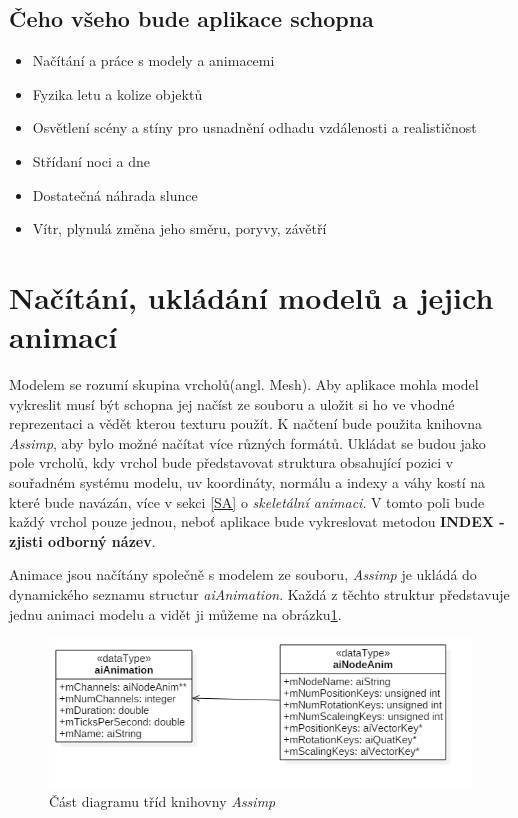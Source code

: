 \subsection{Čeho všeho bude aplikace schopna}
\begin{itemize}
	\item Načítání a práce s modely a animacemi
	\item Fyzika letu a kolize objektů
	\item Osvětlení scény a stíny pro usnadnění odhadu vzdálenosti a realističnost
	\item Střídaní noci a dne
	\item Dostatečná náhrada slunce
	\item Vítr, plynulá změna jeho směru, poryvy, závětří
\end{itemize}
\section{Načítání, ukládání modelů a jejich animací}

Modelem se rozumí skupina vrcholů(angl. Mesh). Aby aplikace mohla model vykreslit musí být schopna jej načíst ze souboru a uložit si ho ve vhodné reprezentaci a vědět kterou texturu použít. K načtení bude použita knihovna \emph{Assimp}\cite{assimp}, aby bylo možné načítat více různých formátů. Ukládat se budou jako pole vrcholů, kdy vrchol bude představovat struktura obsahující pozici v souřadném systému modelu, uv koordináty, normálu a indexy a váhy kostí na které bude navázán, více v sekci \ref{SA} o \emph{skeletální animaci}. V tomto poli bude každý vrchol pouze jednou, neboť aplikace bude vykreslovat metodou \textbf{INDEX - zjisti odborný název}.
    
Animace jsou načítány společně s modelem ze souboru, \emph{Assimp} je ukládá do dynamického seznamu structur \emph{aiAnimation}. Každá z těchto struktur představuje jednu animaci modelu a vidět ji můžeme na obrázku\ref{aiAnimation}. 
\begin{figure}
	\begin{center}
		\includegraphics[scale=0.5]{obrazky-figures/aiAnimation}
		\caption{Část diagramu tříd knihovny \emph{Assimp}\cite{assimp}}\label{aiAnimation}
\end{center}\end{figure}

